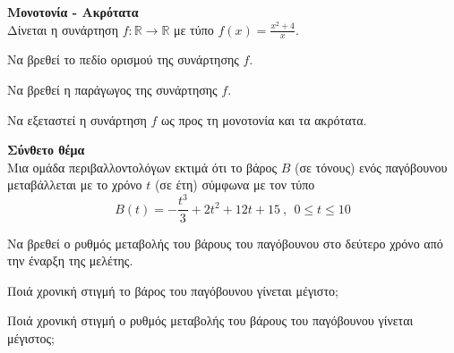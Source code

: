 \documentclass[ektypwsh]{diag-pan-xelatex}
\begin{document}
\begin{thema}
\item \textbf{Μονοτονία - Ακρότατα}\\
Δίνεται η συνάρτηση $ f:\mathbb{R}\rightarrow\mathbb{R} $ με τύπο $ f(x)=\frac{x^2+4}{x} $.
\begin{erwthma}
\item Να βρεθεί το πεδίο ορισμού της συνάρτησης $ f $.
\item Να βρεθεί η παράγωγος της συνάρτησης $ f $.
\item Να εξεταστεί η συνάρτηση $ f $ ως προς τη μονοτονία και τα ακρότατα.
\end{erwthma}
\item \textbf{Σύνθετο θέμα}\\
Μια ομάδα περιβαλλοντολόγων εκτιμά ότι το βάρος $ B $ (σε τόνους) ενός παγόβουνου μεταβάλλεται με το χρόνο $ t $ (σε έτη) σύμφωνα με τον τύπο
\[ B(t)=-\frac{t^3}{3}+2t^2+12t+15\ ,\ \ 0\leq t\leq 10 \]
\begin{erwthma}
\item Να βρεθεί ο ρυθμός μεταβολής του βάρους του παγόβουνου στο δεύτερο χρόνο από την έναρξη της μελέτης.
\item Ποιά χρονική στιγμή το βάρος του παγόβουνου γίνεται μέγιστο;
\item Ποιά χρονική στιγμή ο ρυθμός μεταβολής του βάρους του παγόβουνου γίνεται μέγιστος;\\
\end{erwthma}
\end{thema}
\end{document}
